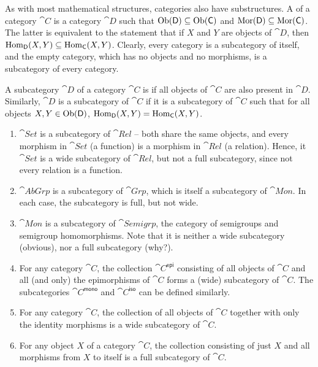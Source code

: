 As with most mathematical structures, categories also have substructures. A  of a category $\cat C$ is a category $\cat D$ such that $\operatorname{Ob}(\mathsf{D}) \subseteq \operatorname{Ob}(\mathsf{C})$ and $\operatorname{Mor}(\mathsf{D}) \subseteq \operatorname{Mor}(\mathsf{C})$. The latter is equivalent to the statement that if $X$ and $Y$ are objects of $\cat D$, then $\operatorname{Hom}_{\mathsf{D}}(X, Y) \subseteq \operatorname{Hom}_{\mathsf{C}}(X, Y)$. Clearly, every category is a subcategory of itself, and the empty category, which has no objects and no morphisms, is a subcategory of every category.

A subcategory $\cat D$ of a category $\cat C$ is  if all objects of $\cat C$ are also present in $\cat D$. Similarly, $\cat D$ is a  subcategory of $\cat C$ if it is a subcategory of $\cat C$ such that for all objects $X, Y \in \operatorname{Ob}(\mathsf{D})$, $\operatorname{Hom}_{\mathsf{D}}(X, Y) = \operatorname{Hom}_{\mathsf{C}}(X, Y)$.

\begin{Example}
\begin{enumerate}
\item $\cat{Set}$ is a subcategory of $\cat{Rel}$ -- both share the same objects, and every morphism in $\cat{Set}$ (a function) is a morphism in $\cat{Rel}$ (a relation). Hence, it $\cat{Set}$ is a wide subcategory of $\cat{Rel}$, but not a full subcategory, since not every relation is a function.
\item $\cat{AbGrp}$ is a subcategory of $\cat{Grp}$, which is itself a subcategory of $\cat{Mon}$. In each case, the subcategory is full, but not wide.
\item $\cat{Mon}$ is a subcategory of $\cat{Semigrp}$, the category of semigroups and semigroup homomorphisms. Note that it is neither a wide subcategory (obvious), nor a full subcategory (why?).
\item For any category $\cat C$, the collection $\cat C^\mathsf{epi}$ consisting of all objects of $\cat C$ and all (and only) the epimorphisms of $\cat C$ forms a (wide) subcategory of $\cat C$. The subcategories $\cat C^\mathsf{mono}$ and $\cat C^\mathsf{iso}$ can be defined similarly.
\item For any category $\cat C$, the collection of all objects of $\cat C$ together with only the identity morphisms is a wide subcategory of $\cat C$.
\item For any object $X$ of a category $\cat C$, the collection consisting of just $X$ and all morphisms from $X$ to itself is a full subcategory of $\cat C$.
\end{enumerate}
\end{Example}

